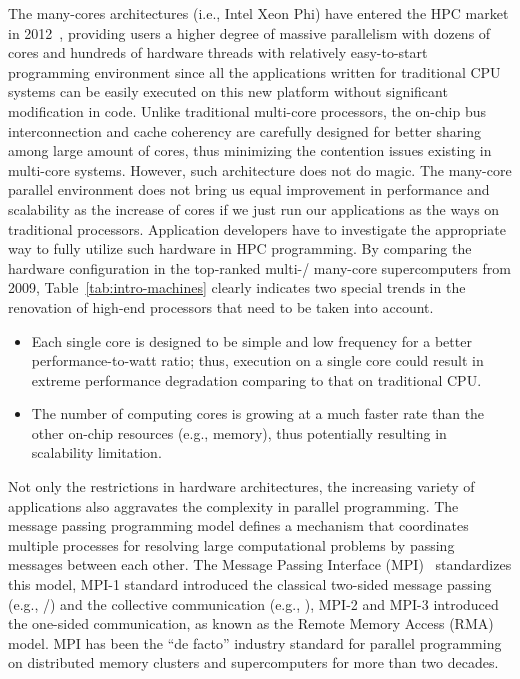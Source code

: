 The many-cores architectures (i.e., Intel Xeon Phi) have entered the HPC
market in 2012~\cite{stampede, tianhe2}, providing users a higher degree of
massive parallelism with dozens of cores and hundreds of hardware threads
with relatively easy-to-start programming environment since all the applications
written for traditional CPU systems can be easily executed on this new
platform without significant modification in code.
Unlike traditional multi-core processors, the on-chip bus interconnection
and cache coherency are carefully designed for better sharing among large
amount of cores, thus minimizing the contention issues existing in
multi-core systems. However, such architecture does not do magic.
The many-core parallel environment does not bring us equal improvement in
performance and scalability as the increase of cores if we just run
our applications as the ways on traditional processors.
Application developers have to investigate the appropriate way to fully
utilize such hardware in HPC programming.
By comparing the hardware configuration in the top-ranked multi-\slash
many-core supercomputers from 2009, Table~\ref{tab:intro-machines} clearly
indicates two special trends in the renovation of high-end processors that
need to be taken into account.

\begin{itemize}
\item Each single core is designed to be simple and low frequency for a
better performance-to-watt ratio; thus, execution on a single core could
result in extreme performance degradation comparing to that on traditional
CPU.

\item The number of computing cores is growing at a much faster rate
than the other on-chip resources (e.g., memory), thus potentially resulting
in scalability limitation.
\end{itemize}

Not only the restrictions in hardware architectures, the increasing variety
of applications also aggravates the complexity in parallel programming.
The message passing programming model defines a mechanism that coordinates
multiple processes for resolving large computational problems by passing
messages between each other. The Message Passing Interface (MPI)~\cite{mpi}
standardizes this model, MPI-1 standard introduced the classical
two-sided message passing (e.g., \slash {}) and
the collective communication (e.g., ), MPI-2 and MPI-3 introduced
the one-sided communication, as known as the Remote Memory Access (RMA)
model. MPI has been the ``de facto'' industry standard for parallel
programming on distributed memory clusters and supercomputers for
more than two decades.

